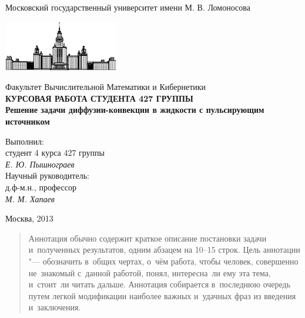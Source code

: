 \documentclass[12pt, a4paper, draft]{article}
\begin{document}
\begin{titlepage}
\begin{center}
    Московский государственный университет имени М. В. Ломоносова

    \bigskip
    \includegraphics[width=50mm]{msu.eps}

    \bigskip
    Факультет Вычислительной Математики и Кибернетики\\[10mm]

    \textsf{\large\bfseries
        КУРСОВАЯ РАБОТА СТУДЕНТА 427 ГРУППЫ\\[10mm]
        Решение задачи диффузии-конвекции в жидкости с пульсирующим источником
    }\\[10mm]

    \begin{flushright}
        \parbox{0.5\textwidth}{
            Выполнил:\\
            студент 4 курса 427 группы\\
            \emph{Е. Ю. Пышнограев}\\[5mm]
            Научный руководитель:\\
            д.ф-м.н., профессор\\
            \emph{М. М. Хапаев}
        }
    \end{flushright}

    \vspace{\fill}
    Москва, 2013
\end{center}
\end{titlepage}

\newpage
\begin{abstract}
    Аннотация обычно содержит 
    краткое описание постановки задачи и~полученных результатов,
    одним абзацем на 10--15 строк.
    Цель аннотации "--- обозначить в~общих чертах, о~чём работа,
    чтобы человек, совершенно не~знакомый с~данной работой,
    понял, интересна~ли ему эта тема, и~стоит~ли читать дальше.
    Аннотация собирается в~последнюю очередь
    путем легкой модификации наиболее важных и~удачных фраз из введения и~заключения.
\end{abstract}

\newpage
\renewcommand{\contentsname}{Содержание}
\tableofcontents

\newpage
\end{document}
